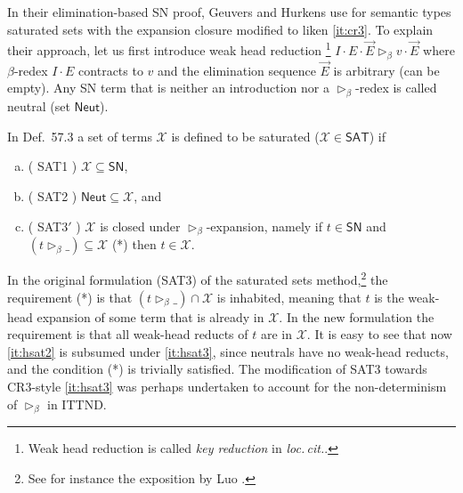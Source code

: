 \documentclass[a4paper,USenglish,cleveref, autoref, thm-restate]{lipics-v2021}
\makeatletter
\def\namedlabel#1#2{\begingroup
    #2%
    \def\@currentlabel{#2}%
    \phantomsection\label{#1}\endgroup
}
\newcommand{\loccit}{\emph{loc.\,cit.}\xspace}
\newcommand{\whd}[1][]{\rhd_{#1}}
\newcommand{\X}{\mathcal{X}}
\newcommand{\SN}{\mathsf{SN}}
\newcommand{\Neut}{\mathsf{Neut}}
\newcommand{\SAT}{\mathsf{SAT}}
\makeatother
\begin{document}
In their elimination-based SN proof, Geuvers and Hurkens
\cite[Section~6.1]{geuversHurkens:types17} use for semantic types
saturated sets with the expansion closure modified to liken
\ref{it:cr3}.  To explain their approach, let us first introduce weak
head reduction%
\footnote{Weak head reduction is called \emph{key reduction} in \loccit.}
$I \cdot E \cdot \vec E \whd[\beta] v \cdot \vec E$ where
$\beta$-redex $I \cdot E$ contracts to $v$ and the elimination
sequence $\vec E$ is arbitrary (can be empty).  Any SN term that is
neither an introduction nor a $\whd[\beta]$-redex is called neutral
(set $\Neut$).

In Def.~57.3 \cite{geuversHurkens:types17}
a set of terms $\X$ is defined to be saturated ($\X \in
\SAT$) if
\begin{enumerate}[a.]

\item (\namedlabel{it:hsat1}{SAT1}) $\X \subseteq \SN$,

\item (\namedlabel{it:hsat2}{SAT2}) $\Neut \subseteq \X$, and

\item (\namedlabel{it:hsat3}{SAT3$'$}) $\X$ is closed under
  $\whd[\beta]$-expansion, namely if $t \in \SN$ and
  $(t \whd[\beta]\_) \subseteq \X$ (*) then $t \in \X$.

\end{enumerate}
In the original formulation (SAT3) of the saturated sets
method,\footnote{See for instance the exposition by Luo \cite{luo:thesis}.}
the requirement (*) is that $(t \whd[\beta]\_) \cap \X$ is inhabited,
meaning that $t$ is the weak-head expansion of some term that is already
in $\X$.  In the new formulation the requirement is that all
weak-head reducts of $t$ are in $\X$.  It is easy to see that now
\ref{it:hsat2} is subsumed under \ref{it:hsat3}, since neutrals have
no weak-head reducts, and the condition (*) is trivially satisfied.
The modification of SAT3 towards CR3-style \ref{it:hsat3} was perhaps
undertaken to account for the non-determinism of $\whd[\beta]$ in
ITTND.
\end{document}
